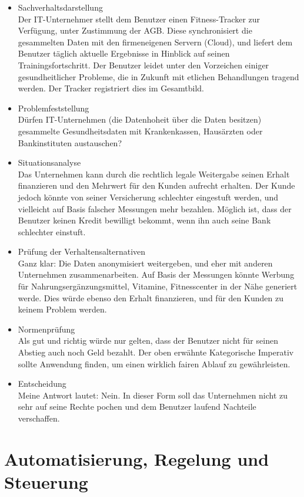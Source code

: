 \documentclass[letterpaper, 12pt]{article}
\let\tempsection\section
\renewcommand\section[1]{\vspace{-0.3cm}\tempsection{#1}\vspace{-0.3cm}}
\begin{document}
\begin{itemize}
	\item Sachverhaltsdarstellung \\
	Der IT-Unternehmer stellt dem Benutzer einen Fitness-Tracker zur Verfügung, unter Zustimmung der AGB. Diese synchronisiert die gesammelten Daten mit den firmeneigenen Servern (Cloud), und liefert dem Benutzer täglich aktuelle Ergebnisse in Hinblick auf seinen Trainingsfortschritt. Der Benutzer leidet unter den Vorzeichen einiger gesundheitlicher Probleme, die in Zukunft mit etlichen Behandlungen tragend werden. Der Tracker registriert dies im Gesamtbild.
	\item Problemfeststellung \\
	Dürfen IT-Unternehmen (die Datenhoheit über die Daten besitzen) gesammelte Gesundheitsdaten mit Krankenkassen, Hausärzten oder Bankinstituten austauschen? \clearpage
	\item Situationsanalyse \\
	Das Unternehmen kann durch die rechtlich legale Weitergabe seinen Erhalt finanzieren und den Mehrwert für den Kunden aufrecht erhalten. Der Kunde jedoch könnte von seiner Versicherung schlechter eingestuft werden, und vielleicht auf Basis falscher Messungen mehr bezahlen. Möglich ist, dass der Benutzer keinen Kredit bewilligt bekommt, wenn ihn auch seine Bank schlechter einstuft.
	\item Prüfung der Verhaltensalternativen \\
	Ganz klar: Die Daten anonymisiert weitergeben, und eher mit anderen Unternehmen zusammenarbeiten. Auf Basis der Messungen könnte Werbung für Nahrungsergänzungsmittel, Vitamine, Fitnesscenter in der Nähe generiert werde. Dies würde ebenso den Erhalt finanzieren, und für den Kunden zu keinem Problem werden.
	\item Normenprüfung \\
	Als gut und richtig würde nur gelten, dass der Benutzer nicht für seinen Abstieg auch noch Geld bezahlt. Der oben erwähnte Kategorische Imperativ sollte Anwendung finden, um einen wirklich fairen Ablauf zu gewährleisten.
	\item Entscheidung \\
	Meine Antwort lautet: Nein. In dieser Form soll das Unternehmen nicht zu sehr auf seine Rechte pochen und dem Benutzer laufend Nachteile verschaffen.
\end{itemize}

\clearpage

\section{Automatisierung, Regelung und Steuerung}
\end{document}
